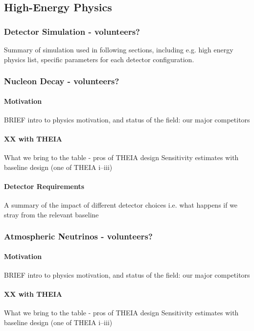 \documentclass[11pt,prd,letterpaper,amsmath,amssymb,final,nofootinbib
,unsortedaddress,superscriptaddress
]{revtex4-1}
\begin{document}
\subsection{High-Energy Physics}
\subsubsection{Detector Simulation - \bf volunteers?}
Summary of simulation used in following sections, including e.g. high energy physics list, specific parameters for each detector configuration.



\subsubsection{Nucleon Decay - \bf volunteers?}
\paragraph{Motivation}
BRIEF intro to physics motivation, and status of the field: our major competitors
\paragraph{XX with THEIA}
What we bring to the table - pros of THEIA design \newline
Sensitivity estimates with baseline design (one of THEIA i--iii)
\paragraph{Detector Requirements}
A summary of the impact of different detector choices i.e. what happens if we stray from the relevant baseline
\subsubsection{Atmospheric Neutrinos - \bf volunteers?}
\paragraph{Motivation}
BRIEF intro to physics motivation, and status of the field: our major competitors
\paragraph{XX with THEIA}
What we bring to the table - pros of THEIA design \newline
Sensitivity estimates with baseline design (one of THEIA i--iii)
\end{document}
